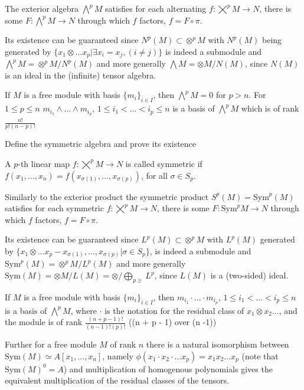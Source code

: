 The exterior algebra \(\bigwedge^{p} M\) satisfies for each alternating \(f : \bigtimes^{p} M \to N\), there is some \(F : \bigwedge^{p} M \to N\)
through which \(f\) factors, \(f = F \circ \pi\).

Its existence can be guaranteed since \(N^p(M) \subset \otimes^{p} M\) with \(N^p(M)\) being generated by \(\{ x_1 \otimes \dots x_p | \exists x_i = x_j, (i \neq j) \}\) 
is indeed a submodule and \(\bigwedge^{p} M = \otimes^{p} M / N^p(M)\) and more generally \(\bigwedge M = \otimes M / N(M)\), since \(N(M)\) is an ideal
in the (infinite) tensor algebra.

If \(M\) is a free module with basis \(\{m_i\}_{i \in I}\), then \(\bigwedge^{p} M = 0\) for \(p > n\). For \(1 \leq p \leq n\) 
\(m_{i_1} \wedge \dots \wedge m_{i_p}\), \(1 \leq i_1 < \dots < i_p \leq n\) is a basis of \(\bigwedge^{p} M\) which is of rank \(\frac{n!}{p!(n - p)!}\)


Define the symmetric algebra and prove its existence

A \(p\)-th linear map \(f : \bigtimes^{p} M \to N\) is called symmetric if \(f(x_1, \dots, x_n) = f(x_{\sigma(1)}, \dots, x_{\sigma(p)})\), for all \(\sigma \in S_p\).

Similarly to the exterior product the symmetric product \(S^p(M) = \text{Sym}^{p}(M)\) 
satisfies for each symmetric \(f : \bigtimes^{p} M \to N\), there is some \(F : \text{Sym}^{p} M \to N\)
through which \(f\) factors, \(f = F \circ \pi\).

Its existence can be guaranteed since \(L^p(M) \subset \otimes^{p} M\) with \(L^p(M)\) generated by \(\{ x_1 \otimes \dots x_p - x_{\sigma(1)}, \dots, x_{\sigma(p)} | \sigma \in S_p \}\), 
is indeed a submodule and \(\text{Sym}^{p}(M) = \otimes^{p} M / L^p(M)\) and more generally \(\text{Sym}(M) = \otimes M / L(M) = \otimes / \bigoplus_{p \geq} L^{p} \), since \(L(M)\) is a (two-sided) ideal.

If \(M\) is a free module with basis \(\{m_i\}_{i \in I}\), then
\(m_{i_1} \cdot \dots \cdot m_{i_p}\), \(1 \leq i_1 < \dots < i_p \leq n\) is a basis of \(\bigwedge^{p} M\), where \(\cdot\) is the notation for the residual class of \(x_1 \otimes x_2 \dots\), and the module is of rank \(\frac{(n + p - 1)!}{(n-1)!(p)!}\) ((n + p - 1) over (n -1))

Further for a free module \(M\) of rank \(n\) there is a natural isomorphism between \(\text{Sym}(M) \simeq A[x_1, \dots, x_n]\),
namely \(\phi(x_1 \cdot x_2 \cdot \dots x_p) = x_1 x_2 \dots x_p\) (note that \(\text{Sym}(M)^{0} = A\)) and multiplication of homogenous
polynomials gives the equivalent multiplication of the residual classes of the tensors.


